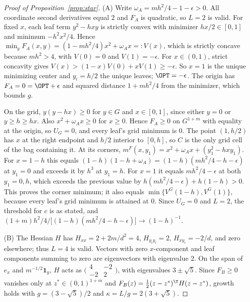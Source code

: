 \begin{proof}[Proof of Proposition~\ref{prop:star}]
(A) Write $\omega_A=mh^2/4-1-\epsilon>0$. All coordinate second derivatives
equal $2$ and $F_A$ is quadratic, so $L=2$ is valid. For fixed $x$, each leaf
term $y^2-hxy$ is strictly convex with minimizer $hx/2\in[0,1]$ and minimum
$-h^2x^2/4$. Hence $\min_yF_A(x,y)=(1-mh^2/4)x^2+\omega_Ax=:V(x)$, which is
strictly concave because $mh^2>4$, with $V(0)=0$ and $V(1)=-\epsilon$. For
$x\in(0,1)$, strict concavity gives $V(x)>(1-x)V(0)+xV(1)\ge-\epsilon$. So
$x=1$ is the unique minimizing center and $y_i=h/2$ the unique leaves;
$\OPT=-\epsilon$. The origin has $F_A=0=\OPT+\epsilon$ and squared distance
$1+mh^2/4$ from the minimizer, which bounds $g$.

On the grid, $y(y-hx)\ge0$ for $y\in G$ and $x\in[0,1]$, since either $y=0$
or $y\ge h\ge hx$. Also $x^2+\omega_Ax\ge0$ for $x\ge0$. Hence $F_A\ge0$ on
$G^{1+m}$ with equality at the origin, so $U_G=0$, and every leaf's grid
minimum is $0$. The point $(1,h/2)$ has $x$ at the right endpoint and $h/2$
interior to $[0,h]$, so $C$ is the only grid cell of the bag containing it.
At its corners, $m^F(x,y_1)=x^2+\omega_Ax+(y_1^2-hxy_1)$. For $x=1-h$ this
equals $(1-h)(1-h+\omega_A)=(1-h)(mh^2/4-h-\epsilon)$ at $y_1=0$ and exceeds
it by $h^3$ at $y_1=h$. For $x=1$ it equals $mh^2/4-\epsilon$ at both
$y_1=0,h$, which exceeds the previous value by
$h(mh^2/4-\epsilon)+h(1-h)>0$. This proves the corner minimum; it also equals
$\min\{V^G(1-h),V^G(1)\}$, because every leaf's grid minimum is attained at
$0$. Since $U_G=0$ and $L=2$, the threshold for $c$ is as stated, and
$(1+m)h^2/4\big/\bigl[(1-h)(mh^2/4-h-\epsilon)\bigr]\to(1-h)^{-1}$.

(B) The Hessian $H$ has $H_{xx}=2+2m/d^2=4$, $H_{y_iy_i}=2$,
$H_{xy_i}=-2/d$, and zero elsewhere; thus $L=4$ is valid. Vectors with zero
$x$-component and leaf components summing to zero are eigenvectors with
eigenvalue $2$. On the span of $e_x$ and $m^{-1/2}\mathbf 1_y$, $H$ acts as
$\bigl(\begin{smallmatrix}4&-2\\-2&2\end{smallmatrix}\bigr)$, with
eigenvalues $3\pm\sqrt5$. Since $F_B\ge0$ vanishes only at
$z^*\in(0,1)^{1+m}$ and $F_B(z)=\frac12(z-z^*)^{\T}H(z-z^*)$, growth holds
with $g=(3-\sqrt5)/2$ and $\kappa=L/g=2(3+\sqrt5)$.


\end{proof}
